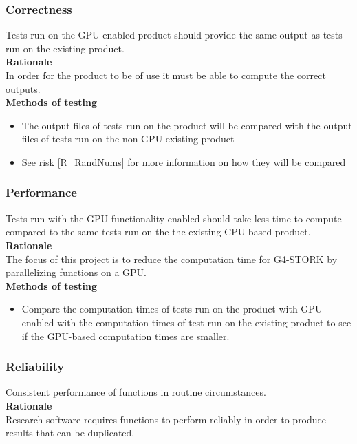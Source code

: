 \documentclass[12pt]{article}
\begin{document}
\subsubsection{Correctness}
Tests run on the GPU-enabled product should provide the same output as tests run on the existing product.\\

\textbf{Rationale}\\
In order for the product to be of use it must be able to compute the correct outputs.\\

\textbf{Methods of testing}
\begin{itemize}
\item The output files of tests run on the product will be compared with the output files of tests run on the non-GPU existing product
\item See risk \ref{R_RandNums} for more information on how they will be compared
\end{itemize}

\subsubsection{Performance}
Tests run with the GPU functionality enabled should take less time to compute compared to the same tests run on the the existing CPU-based product.\\

\textbf{Rationale}\\
The focus of this project is to reduce the computation time for G4-STORK by parallelizing functions on a GPU.\\

\textbf{Methods of testing}
\begin{itemize}
\item Compare the computation times of tests run on the product with GPU enabled with the computation times of test run on the existing product to see if the GPU-based computation times are smaller.
\end{itemize}

\subsubsection{Reliability}
Consistent performance of functions in routine circumstances.\\

\textbf{Rationale}\\
Research software requires functions to perform reliably in order to produce results that can be duplicated.\\
\end{document}
